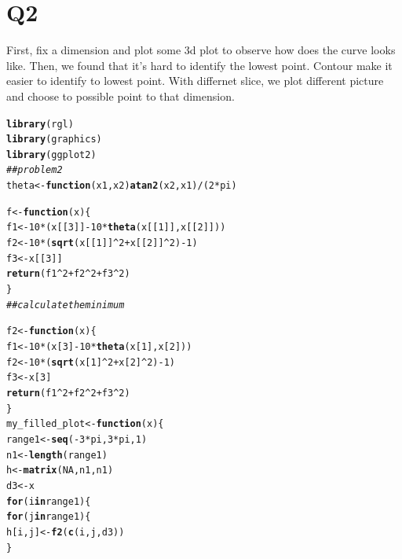 \documentclass{article}\usepackage[]{graphicx}\usepackage[]{color}
\makeatletter
\newcommand{\hlnum}[1]{\textcolor[rgb]{0.686,0.059,0.569}{#1}}%
\newcommand{\hlcom}[1]{\textcolor[rgb]{0.678,0.584,0.686}{\textit{#1}}}%
\newcommand{\hlopt}[1]{\textcolor[rgb]{0,0,0}{#1}}%
\newcommand{\hlstd}[1]{\textcolor[rgb]{0.345,0.345,0.345}{#1}}%
\newcommand{\hlkwa}[1]{\textcolor[rgb]{0.161,0.373,0.58}{\textbf{#1}}}%
\newcommand{\hlkwb}[1]{\textcolor[rgb]{0.69,0.353,0.396}{#1}}%
\newcommand{\hlkwc}[1]{\textcolor[rgb]{0.333,0.667,0.333}{#1}}%
\newcommand{\hlkwd}[1]{\textcolor[rgb]{0.737,0.353,0.396}{\textbf{#1}}}%
\newenvironment{kframe}{%
 \def\at@end@of@kframe{}%
 \ifinner\ifhmode%
  \def\at@end@of@kframe{\end{minipage}}%
  \begin{minipage}{\columnwidth}%
 \fi\fi%
 \def\FrameCommand##1{\hskip\@totalleftmargin \hskip-\fboxsep
 \colorbox{shadecolor}{##1}\hskip-\fboxsep
     \hskip-\linewidth \hskip-\@totalleftmargin \hskip\columnwidth}%
 \MakeFramed {\advance\hsize-\width
   \@totalleftmargin\z@ \linewidth\hsize
   \@setminipage}}%
 {\par\unskip\endMakeFramed%
 \at@end@of@kframe}
\newenvironment{knitrout}{}{} %
\makeatother
\begin{document}
\section{Q2}
First, fix a dimension and plot some 3d plot to observe how does the curve looks like. Then, we found that it's hard to identify the lowest point. Contour make it easier to identify to lowest point. With differnet slice, we plot different picture and choose to possible point to that dimension.
\begin{knitrout}
\color{fgcolor}\begin{kframe}
\begin{alltt}
\hlkwd{library}\hlstd{(rgl)}
\hlkwd{library}\hlstd{(graphics)}
\hlkwd{library}\hlstd{(ggplot2)}
\hlcom{## problem 2}
\hlstd{theta} \hlkwb{<-} \hlkwa{function}\hlstd{(}\hlkwc{x1}\hlstd{,}\hlkwc{x2}\hlstd{)} \hlkwd{atan2}\hlstd{(x2, x1)}\hlopt{/}\hlstd{(}\hlnum{2}\hlopt{*}\hlstd{pi)}

\hlstd{f} \hlkwb{<-} \hlkwa{function}\hlstd{(}\hlkwc{x}\hlstd{) \{}
  \hlstd{f1} \hlkwb{<-} \hlnum{10}\hlopt{*}\hlstd{(x[[}\hlnum{3}\hlstd{]]} \hlopt{-} \hlnum{10}\hlopt{*}\hlkwd{theta}\hlstd{(x[[}\hlnum{1}\hlstd{]],x[[}\hlnum{2}\hlstd{]]))}
  \hlstd{f2} \hlkwb{<-} \hlnum{10}\hlopt{*}\hlstd{(}\hlkwd{sqrt}\hlstd{(x[[}\hlnum{1}\hlstd{]]}\hlopt{^}\hlnum{2} \hlopt{+} \hlstd{x[[}\hlnum{2}\hlstd{]]}\hlopt{^}\hlnum{2}\hlstd{)} \hlopt{-} \hlnum{1}\hlstd{)}
  \hlstd{f3} \hlkwb{<-} \hlstd{x[[}\hlnum{3}\hlstd{]]}
  \hlkwd{return}\hlstd{(f1}\hlopt{^}\hlnum{2} \hlopt{+} \hlstd{f2}\hlopt{^}\hlnum{2} \hlopt{+} \hlstd{f3}\hlopt{^}\hlnum{2}\hlstd{)}
\hlstd{\}}
\hlcom{## calculate the minimum}

\hlstd{f2} \hlkwb{<-} \hlkwa{function}\hlstd{(}\hlkwc{x}\hlstd{) \{}
  \hlstd{f1} \hlkwb{<-} \hlnum{10}\hlopt{*}\hlstd{(x[}\hlnum{3}\hlstd{]} \hlopt{-} \hlnum{10}\hlopt{*}\hlkwd{theta}\hlstd{(x[}\hlnum{1}\hlstd{],x[}\hlnum{2}\hlstd{]))}
  \hlstd{f2} \hlkwb{<-} \hlnum{10}\hlopt{*}\hlstd{(}\hlkwd{sqrt}\hlstd{(x[}\hlnum{1}\hlstd{]}\hlopt{^}\hlnum{2} \hlopt{+} \hlstd{x[}\hlnum{2}\hlstd{]}\hlopt{^}\hlnum{2}\hlstd{)} \hlopt{-} \hlnum{1}\hlstd{)}
  \hlstd{f3} \hlkwb{<-} \hlstd{x[}\hlnum{3}\hlstd{]}
  \hlkwd{return}\hlstd{(f1}\hlopt{^}\hlnum{2} \hlopt{+} \hlstd{f2}\hlopt{^}\hlnum{2} \hlopt{+} \hlstd{f3}\hlopt{^}\hlnum{2}\hlstd{)}
\hlstd{\}}
\hlstd{my_filled_plot} \hlkwb{<-} \hlkwa{function}\hlstd{(}\hlkwc{x}\hlstd{) \{}
  \hlstd{range1} \hlkwb{<-} \hlkwd{seq}\hlstd{(}\hlopt{-}\hlnum{3}\hlopt{*}\hlstd{pi,}\hlnum{3}\hlopt{*}\hlstd{pi,}\hlnum{1}\hlstd{)}
  \hlstd{n1} \hlkwb{<-} \hlkwd{length}\hlstd{(range1)}
  \hlstd{h} \hlkwb{<-} \hlkwd{matrix}\hlstd{(}\hlnum{NA}\hlstd{,n1,n1)}
  \hlstd{d3} \hlkwb{<-} \hlstd{x}
  \hlkwa{for} \hlstd{(i} \hlkwa{in} \hlstd{range1)\{}
    \hlkwa{for}\hlstd{(j} \hlkwa{in} \hlstd{range1)\{}
      \hlstd{h[i,j]} \hlkwb{<-} \hlkwd{f2}\hlstd{(}\hlkwd{c}\hlstd{(i,j,d3))}
    \hlstd{\}}


\end{alltt}
\end{kframe}
\end{knitrout}
\end{document}
